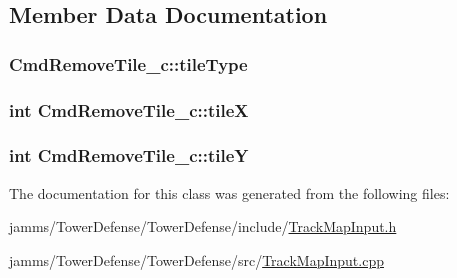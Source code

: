 \subsection{Member Data Documentation}
\hypertarget{class_cmd_remove_tile__c_a1d7eeadf66dc25b16f70db109e9445cd}{
\subsubsection[{tile\+Type}]{ Cmd\+Remove\+Tile\+\_\+c\+::tile\+Type\hspace{0.3cm}{\ttfamily [private]}}}\label{class_cmd_remove_tile__c_a1d7eeadf66dc25b16f70db109e9445cd}
\hypertarget{class_cmd_remove_tile__c_a59d402f518e7e7b9682e80cc8882ca78}{
\subsubsection[{tile\+X}]{\setlength{\rightskip}{0pt plus 5cm}int Cmd\+Remove\+Tile\+\_\+c\+::tile\+X\hspace{0.3cm}{\ttfamily [private]}}}\label{class_cmd_remove_tile__c_a59d402f518e7e7b9682e80cc8882ca78}
\hypertarget{class_cmd_remove_tile__c_aa76c6c8cca931cb8d9a70263494f8cec}{
\subsubsection[{tile\+Y}]{\setlength{\rightskip}{0pt plus 5cm}int Cmd\+Remove\+Tile\+\_\+c\+::tile\+Y\hspace{0.3cm}{\ttfamily [private]}}}\label{class_cmd_remove_tile__c_aa76c6c8cca931cb8d9a70263494f8cec}


The documentation for this class was generated from the following files\+:\begin{DoxyCompactItemize}
\item 
jamms/\+Tower\+Defense/\+Tower\+Defense/include/\hyperlink{_track_map_input_8h}{Track\+Map\+Input.\+h}\item 
jamms/\+Tower\+Defense/\+Tower\+Defense/src/\hyperlink{src_2_track_map_input_8cpp}{Track\+Map\+Input.\+cpp}\end{DoxyCompactItemize}

